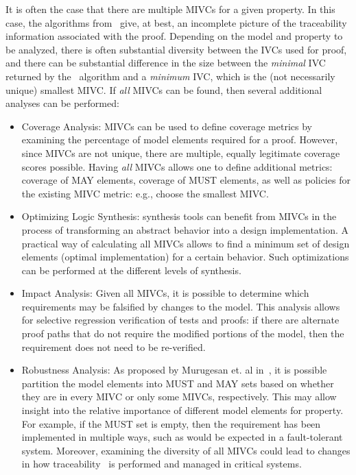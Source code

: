 It is often the case that there are multiple MIVCs for a given property.  In this case, the algorithms from~\cite{Ghass16} give, at best, an
incomplete picture of the traceability information associated with the proof.  Depending on the model and property to be analyzed, there is often substantial diversity between the IVCs used for proof, and there can be substantial difference in the size between the {\em minimal} IVC returned by the \ucbfalg\ algorithm and a {\em minimum} IVC, which is the (not necessarily unique) smallest MIVC.
 If {\em all} MIVCs can be found, then several additional analyses can be performed:
\begin{itemize}
    \item Coverage Analysis: MIVCs can be used to define coverage metrics by examining the percentage of model elements required for a proof.  However, since MIVCs are not unique, there are multiple, equally legitimate coverage scores possible.  Having \emph{all} MIVCs allows one to define additional metrics: coverage of MAY elements, coverage of MUST elements, as well as policies for the existing MIVC metric: e.g., choose the smallest MIVC. %
    \item Optimizing Logic Synthesis:  synthesis tools can benefit from MIVCs in the process of transforming an abstract behavior into a design implementation. A practical way of calculating all MIVCs allows to find a minimum set of design elements (optimal implementation) for a certain behavior. Such optimizations can be performed at the different levels of synthesis.
    \item Impact Analysis: Given all MIVCs, it is possible to determine which requirements may be falsified by changes to the model.  This analysis allows for selective regression verification of tests and proofs: if there are alternate proof paths that do not require the modified portions of the model, then the requirement does not need to be re-verified.
    \item Robustness Analysis: As proposed by Murugesan et. al in~\cite{Murugesan16:renext}, it is possible partition the model elements into MUST and MAY sets based on whether they are in every MIVC or only some MIVCs, respectively.  This may allow insight into the relative importance of different model elements for property.  For example, if the MUST set is empty, then the requirement has been implemented in multiple ways, such as would be expected in a fault-tolerant system.
        Moreover, examining the diversity of all MIVCs could lead to changes in how traceability~\cite{cleland2007best} is performed and managed in critical systems.
\end{itemize}
